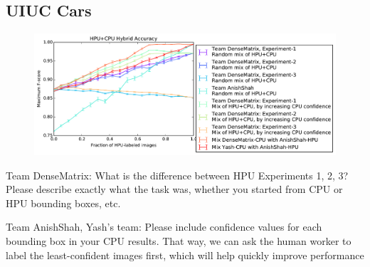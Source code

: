 \documentclass[10pt,twocolumn,letterpaper]{article}
\newcommand{\todo}{\colorbox{yellow}{\fbox{\LARGE{TODO}}}}
\begin{document}



\subsection{UIUC Cars}
\begin{figure}[t]
  \includegraphics[width=1\linewidth]{figure-UIUC-Cars-acc-vs-fraction.pdf}
\end{figure}

\todo Team DenseMatrix: What is the difference between HPU Experiments 1, 2, 3? Please describe exactly what the task was, whether you started from CPU or HPU bounding boxes, etc.

\todo Team AnishShah, Yash's team: Please include confidence values for each bounding box in your CPU results. That way, we can ask the human worker to label the least-confident images first, which will help quickly improve performance
\end{document}
